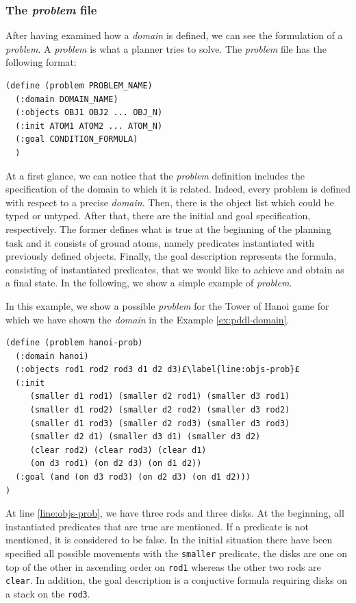 \subsubsection{The \textit{problem} file} 
After having examined how a \PDDL \textit{domain} is defined, we can see the formulation of a \PDDL \textit{problem}. A \PDDL \textit{problem} is what a planner tries to solve. The \textit{problem} file has the following format:
\begin{lstlisting}[language=PDDL, escapechar=£, label={code:pddl-domain}]
(define (problem PROBLEM_NAME)
  (:domain DOMAIN_NAME)
  (:objects OBJ1 OBJ2 ... OBJ_N)
  (:init ATOM1 ATOM2 ... ATOM_N)
  (:goal CONDITION_FORMULA)
  )
\end{lstlisting}
At a first glance, we can notice that the \textit{problem} definition includes the specification of the domain to which it is related. Indeed, every problem is defined with respect to a precise \textit{domain}. Then, there is the object list which could be typed or untyped. After that, there are the initial and goal specification, respectively. The former defines what is true at the beginning of the planning task and it consists of ground atoms, namely predicates instantiated with previously defined objects. Finally, the goal description represents the formula, consisting of instantiated predicates, that we would like to achieve and obtain as a final state.
In the following, we show a simple example of \PDDL \textit{problem}.

\begin{example}
In this example, we show a possible \PDDL \textit{problem} for the Tower of Hanoi game for which we have shown the \textit{domain} in the Example \ref{ex:pddl-domain}.
\begin{lstlisting}[language=PDDL, escapechar=£]
(define (problem hanoi-prob)
  (:domain hanoi)
  (:objects rod1 rod2 rod3 d1 d2 d3)£\label{line:objs-prob}£
  (:init 
     (smaller d1 rod1) (smaller d2 rod1) (smaller d3 rod1)
     (smaller d1 rod2) (smaller d2 rod2) (smaller d3 rod2)
     (smaller d1 rod3) (smaller d2 rod3) (smaller d3 rod3)
     (smaller d2 d1) (smaller d3 d1) (smaller d3 d2)
     (clear rod2) (clear rod3) (clear d1)
     (on d3 rod1) (on d2 d3) (on d1 d2))
  (:goal (and (on d3 rod3) (on d2 d3) (on d1 d2)))
)
\end{lstlisting}
At line \ref{line:objs-prob}, we have three rods and three disks. At the beginning, all instantiated predicates that are true are mentioned. If a predicate is not mentioned, it is considered to be false. In the initial situation there have been specified all possible movements with the \texttt{smaller} predicate, the disks are one on top of the other in ascending order on \texttt{rod1} whereas the other two rods are \texttt{clear}. In addition, the goal description is a conjuctive formula requiring disks on a stack on the \texttt{rod3}.
\end{example}

